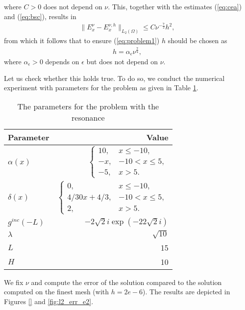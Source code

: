 where $C>0$ does not depend on $\nu$. This, together with the estimates (\ref{eq:cea}) and (\ref{eq:bsc}), results in 
\begin{align*}
 \|E^{\nu}_{x}-E^{\nu,h}_{x}\|_{L_{2}(\Omega)}\leq C\nu^{-\frac{7}{2}}h^2,
\end{align*}
from which it follows that to ensure (\ref{eq:problem1}) $h$ should be chosen as 
\begin{align}
\label{eq:estimate_h}
 h=\alpha_{\epsilon}\nu^{\frac{7}{4}},
\end{align}
where $\alpha_{\epsilon}>0$ depends on $\epsilon$ but does not depend on $\nu$. 

Let us check whether this holds true. 
To do so, we conduct the  numerical experiment with parameters for the problem as given in Table \ref{tab:parameters}.
\begin{table}
\begin{tabular}{l|r}
Parameter & Value \\
\hline
$\alpha(x)$ & $\left\{\begin{array}{cc}
10, & x\leq -10,\\
-x, & -10<x\leq 5,\\
-5, & x>5.
\end{array}\right.$ \\
$\delta(x)$ & 
$\left\{\begin{array}{cc}
0, & x\leq -10,\\
4/30x+4/3,& -10<x\leq 5,\\
2, & x>5.
\end{array}\right.$ \\
$g^{inc}(-L)$ & $-2 \sqrt{2}i\exp(-22\sqrt{2}i)$\\
$\lambda$ & 
$\sqrt{10}$\\
$L$& 15\\
$H$ & 10 \\
\end{tabular}
\caption{The parameters for the problem with the resonance}
\label{tab:parameters}
\end{table}

 We fix $\nu$ and compute the error of the solution compared to the solution computed on the finest mesh  (with $h=2e-6$). 
 The results are depicted in Figures \ref{} and \ref{fig:l2_err_e2}.
 \begin{figure}
  
 \end{figure}


